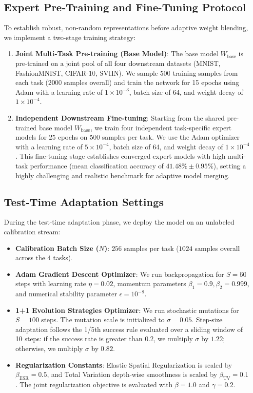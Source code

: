 \documentclass{article}
\theoremstyle{plain}
\theoremstyle{definition}
\theoremstyle{remark}
\begin{document}
\subsection{Expert Pre-Training and Fine-Tuning Protocol}
To establish robust, non-random representations before adaptive weight blending, we implement a two-stage training strategy:
\begin{enumerate}
    \item \textbf{Joint Multi-Task Pre-training (Base Model)}: The base model $W_{\text{base}}$ is pre-trained on a joint pool of all four downstream datasets (MNIST, FashionMNIST, CIFAR-10, SVHN). We sample 500 training samples from each task (2000 samples overall) and train the network for 15 epochs using Adam with a learning rate of $1 \times 10^{-3}$, batch size of 64, and weight decay of $1 \times 10^{-4}$.
    \item \textbf{Independent Downstream Fine-tuning}: Starting from the shared pre-trained base model $W_{\text{base}}$, we train four independent task-specific expert models for 25 epochs on 500 samples per task. We use the Adam optimizer with a learning rate of $5 \times 10^{-4}$, batch size of 64, and weight decay of $1 \times 10^{-4}$. This fine-tuning stage establishes converged expert models with high multi-task performance (mean classification accuracy of $41.48\% \pm 0.95\%$), setting a highly challenging and realistic benchmark for adaptive model merging.
\end{enumerate}

\subsection{Test-Time Adaptation Settings}
During the test-time adaptation phase, we deploy the model on an unlabeled calibration stream:
\begin{itemize}
    \item \textbf{Calibration Batch Size ($N$)}: $256$ samples per task ($1024$ samples overall across the 4 tasks).
    \item \textbf{Adam Gradient Descent Optimizer}: We run backpropagation for $S=60$ steps with learning rate $\eta = 0.02$, momentum parameters $\beta_1 = 0.9, \beta_2 = 0.999$, and numerical stability parameter $\epsilon = 10^{-8}$.
    \item \textbf{1+1 Evolution Strategies Optimizer}: We run stochastic mutations for $S=100$ steps. The mutation scale is initialized to $\sigma = 0.05$. Step-size adaptation follows the 1/5th success rule evaluated over a sliding window of 10 steps: if the success rate is greater than $0.2$, we multiply $\sigma$ by $1.22$; otherwise, we multiply $\sigma$ by $0.82$.
    \item \textbf{Regularization Constants}: Elastic Spatial Regularization is scaled by $\beta_{\text{ESR}} = 0.5$, and Total Variation depth-wise smoothness is scaled by $\beta_{\text{TV}} = 0.1$. The joint regularization objective is evaluated with $\beta = 1.0$ and $\gamma = 0.2$.
\end{itemize}
\end{document}
